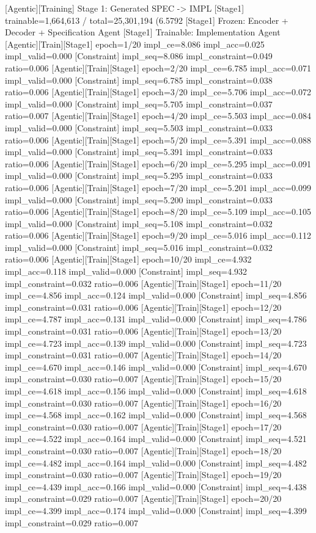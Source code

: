 [Agentic][Training] Stage 1: Generated SPEC -> IMPL
[Stage1] trainable=1,664,613 / total=25,301,194 (6.5792%
[Stage1] Frozen: Encoder + Decoder + Specification Agent
[Stage1] Trainable: Implementation Agent
[Agentic][Train][Stage1] epoch=1/20 impl_ce=8.086 impl_acc=0.025 impl_valid=0.000
[Constraint] impl_seq=8.086 impl_constraint=0.049 ratio=0.006
[Agentic][Train][Stage1] epoch=2/20 impl_ce=6.785 impl_acc=0.071 impl_valid=0.000
[Constraint] impl_seq=6.785 impl_constraint=0.038 ratio=0.006
[Agentic][Train][Stage1] epoch=3/20 impl_ce=5.706 impl_acc=0.072 impl_valid=0.000
[Constraint] impl_seq=5.705 impl_constraint=0.037 ratio=0.007
[Agentic][Train][Stage1] epoch=4/20 impl_ce=5.503 impl_acc=0.084 impl_valid=0.000
[Constraint] impl_seq=5.503 impl_constraint=0.033 ratio=0.006
[Agentic][Train][Stage1] epoch=5/20 impl_ce=5.391 impl_acc=0.088 impl_valid=0.000
[Constraint] impl_seq=5.391 impl_constraint=0.033 ratio=0.006
[Agentic][Train][Stage1] epoch=6/20 impl_ce=5.295 impl_acc=0.091 impl_valid=0.000
[Constraint] impl_seq=5.295 impl_constraint=0.033 ratio=0.006
[Agentic][Train][Stage1] epoch=7/20 impl_ce=5.201 impl_acc=0.099 impl_valid=0.000
[Constraint] impl_seq=5.200 impl_constraint=0.033 ratio=0.006
[Agentic][Train][Stage1] epoch=8/20 impl_ce=5.109 impl_acc=0.105 impl_valid=0.000
[Constraint] impl_seq=5.108 impl_constraint=0.032 ratio=0.006
[Agentic][Train][Stage1] epoch=9/20 impl_ce=5.016 impl_acc=0.112 impl_valid=0.000
[Constraint] impl_seq=5.016 impl_constraint=0.032 ratio=0.006
[Agentic][Train][Stage1] epoch=10/20 impl_ce=4.932 impl_acc=0.118 impl_valid=0.000
[Constraint] impl_seq=4.932 impl_constraint=0.032 ratio=0.006
[Agentic][Train][Stage1] epoch=11/20 impl_ce=4.856 impl_acc=0.124 impl_valid=0.000
[Constraint] impl_seq=4.856 impl_constraint=0.031 ratio=0.006
[Agentic][Train][Stage1] epoch=12/20 impl_ce=4.787 impl_acc=0.131 impl_valid=0.000
[Constraint] impl_seq=4.786 impl_constraint=0.031 ratio=0.006
[Agentic][Train][Stage1] epoch=13/20 impl_ce=4.723 impl_acc=0.139 impl_valid=0.000
[Constraint] impl_seq=4.723 impl_constraint=0.031 ratio=0.007
[Agentic][Train][Stage1] epoch=14/20 impl_ce=4.670 impl_acc=0.146 impl_valid=0.000
[Constraint] impl_seq=4.670 impl_constraint=0.030 ratio=0.007
[Agentic][Train][Stage1] epoch=15/20 impl_ce=4.618 impl_acc=0.156 impl_valid=0.000
[Constraint] impl_seq=4.618 impl_constraint=0.030 ratio=0.007
[Agentic][Train][Stage1] epoch=16/20 impl_ce=4.568 impl_acc=0.162 impl_valid=0.000
[Constraint] impl_seq=4.568 impl_constraint=0.030 ratio=0.007
[Agentic][Train][Stage1] epoch=17/20 impl_ce=4.522 impl_acc=0.164 impl_valid=0.000
[Constraint] impl_seq=4.521 impl_constraint=0.030 ratio=0.007
[Agentic][Train][Stage1] epoch=18/20 impl_ce=4.482 impl_acc=0.164 impl_valid=0.000
[Constraint] impl_seq=4.482 impl_constraint=0.030 ratio=0.007
[Agentic][Train][Stage1] epoch=19/20 impl_ce=4.439 impl_acc=0.166 impl_valid=0.000
[Constraint] impl_seq=4.438 impl_constraint=0.029 ratio=0.007
[Agentic][Train][Stage1] epoch=20/20 impl_ce=4.399 impl_acc=0.174 impl_valid=0.000
[Constraint] impl_seq=4.399 impl_constraint=0.029 ratio=0.007

